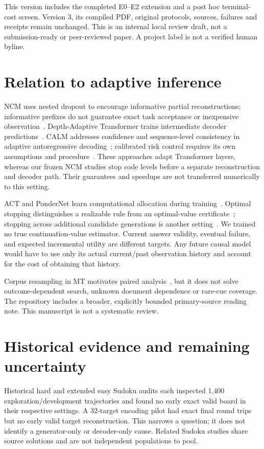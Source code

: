 \documentclass[11pt]{article}
\begin{document}
This version includes the completed E0--E2 extension and a post hoc terminal-cost screen. Version 3, its compiled PDF, original protocols, sources, failures and receipts remain unchanged. This is an internal local review draft, not a submission-ready or peer-reviewed paper. A project label is not a verified human byline.

\section{Relation to adaptive inference}
NCM uses nested dropout to encourage informative partial reconstructions; informative prefixes do not guarantee exact task acceptance or inexpensive observation~\cite{ncm}. Depth-Adaptive Transformer trains intermediate decoder predictions~\cite{dat}. CALM addresses confidence and sequence-level consistency in adaptive autoregressive decoding~\cite{calm}; calibrated risk control requires its own assumptions and procedure~\cite{ltt}. These approaches adapt Transformer layers, whereas our frozen NCM studies stop code levels before a separate reconstruction and decoder path. Their guarantees and speedups are not transferred numerically to this setting.

ACT and PonderNet learn computational allocation during training~\cite{act,ponder}. Optimal stopping distinguishes a realizable rule from an optimal-value certificate~\cite{optimal}; stopping across additional candidate generations is another setting~\cite{bestn}. We trained no true continuation-value estimator. Current answer validity, eventual failure, and expected incremental utility are different targets. Any future causal model would have to use only its actual current/past observation history and account for the cost of obtaining that history.

Corpus resampling in MT motivates paired analysis~\cite{koehn}, but it does not solve outcome-dependent search, unknown document dependence or rare-cue coverage. The repository includes a broader, explicitly bounded primary-source reading note. This manuscript is not a systematic review.

\section{Historical evidence and remaining uncertainty}
Historical hard and extended easy Sudoku audits each inspected 1,400 exploration/development trajectories and found no early exact valid board in their respective settings. A 32-target encoding pilot had exact final round trips but no early valid target reconstruction. This narrows a question; it does not identify a generator-only or decoder-only cause. Related Sudoku studies share source solutions and are not independent populations to pool.
\end{document}
